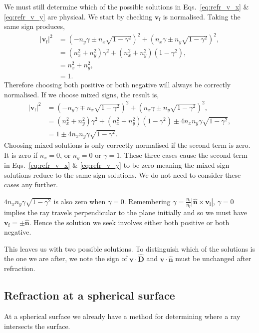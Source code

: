 \documentclass{article}
\let\vec \bm
\newcommand{\mrm}[1]{\mathrm{#1}}
\begin{document}
We must still determine which of the possible solutions in Eqs.~\ref{eq:refr_v_x} \& \ref{eq:refr_v_y} are physical. We start by checking $\vec{v}_\mrm{f}$ is normalised. Taking the same sign produces,
\begin{align}
    |\vec{v}_\mrm{f}|^2
    &=
    (-n_y \gamma \pm n_x \sqrt{1-\gamma^2})^2
    +
    (n_x \gamma \pm n_y \sqrt{1-\gamma^2})^2, \\
    &=
    (n_x^2 + n_y^2)\gamma^2 + (n_x^2 + n_y^2)(1-\gamma^2), \\
    &=
    n_x^2 + n_y^2, \\
    &= 1.
\end{align}
Therefore choosing both positive or both negative will always be correctly normalised. If we choose mixed signs, the result is,
\begin{align}
    |\vec{v}_\mrm{f}|^2
    &=
    (-n_y \gamma \mp n_x \sqrt{1-\gamma^2})^2
    +
    (n_x \gamma \pm n_y \sqrt{1-\gamma^2})^2, \\
    &=
    (n_x^2 + n_y^2)\gamma^2 + (n_x^2 + n_y^2)(1-\gamma^2)
    \pm
    4 n_x n_y \gamma \sqrt{1-\gamma^2}, \\
    &=
    1
    \pm
    4 n_x n_y \gamma \sqrt{1-\gamma^2}.
\end{align}
Choosing mixed solutions is only correctly normalised if the second term is zero. It is zero if $n_x=0$, or $n_y=0$ or $\gamma=1$. These three cases cause the second term in Eqs.~\ref{eq:refr_v_x} \& \ref{eq:refr_v_y} to be zero meaning the mixed sign solutions reduce to the same sign solutions. We do not need to consider these cases any further.

$4 n_x n_y \gamma \sqrt{1-\gamma^2}$ is also zero when $\gamma=0$. Remembering $\gamma = \frac{n_\mrm{i}}{n_\mrm{f}} |\vec{\hat{n}} \times \vec{v}_\mrm{i}|$, $\gamma=0$ implies the ray travels perpendicular to the plane initially and so we must have $\vec{v}_\mrm{f} = \pm \vec{\hat{n}}$. Hence the solution we seek involves either both positive or both negative.

This leaves us with two possible solutions. To distinguish which of the solutions is the one we are after, we note the sign of $\vec{v} \cdot \vec{\hat{D}}$ and $\vec{v} \cdot \vec{\hat{n}}$ must be unchanged after refraction.

\subsection{Refraction at a spherical surface}
At a spherical surface we already have a method for determining where a ray intersects the surface.
\end{document}
